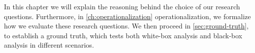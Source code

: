 \label{ch:methodology}

In this chapter we will explain the reasoning behind the choice of our research questions. 
Furthermore, in \autoref{ch:operationalization} operationalization, we formalize how we evaluate these research questions. 
We then proceed in \autoref{sec:ground-truth}, to establish a ground truth, which tests both white-box analysis and black-box analysis in 
different scenarios.



